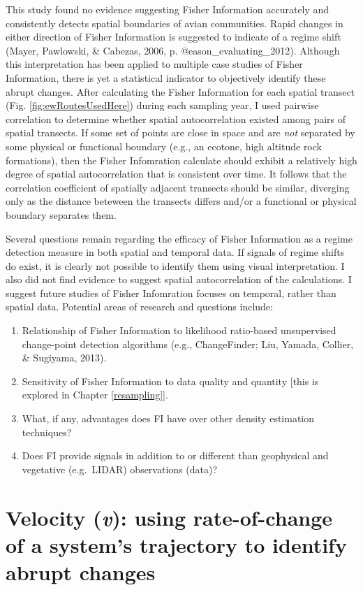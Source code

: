 \documentclass[12pt,twoside,openany]{reedthesis}
\providecommand{\tightlist}{%
  \setlength{\itemsep}{0pt}\setlength{\parskip}{0pt}}
\begin{document}
This study found no evidence suggesting Fisher Information accurately and consistently detects spatial boundaries of avian communities. Rapid changes in either direction of Fisher Information is suggested to indicate of a regime shift (Mayer, Pawlowski, \& Cabezas, 2006, p. @eason\_evaluating\_2012). Although this interpretation has been applied to multiple case studies of Fisher Information, there is yet a statistical indicator to objectively identify these abrupt changes. After calculating the Fisher Information for each spatial transect (Fig. \ref{fig:ewRoutesUsedHere}) during each sampling year, I used pairwise correlation to determine whether spatial autocorrelation existed among pairs of spatial transects. If some set of points are close in space and are \emph{not} separated by some physical or functional boundary (e.g., an ecotone, high altitude rock formations), then the Fisher Infomration calculate should exhibit a relatively high degree of spatial autocorrelation that is consistent over time. It follows that the correlation coefficient of spatially adjacent transects should be similar, diverging only as the distance beteween the transects differs and/or a functional or physical boundary separates them.

Several questions remain regarding the efficacy of Fisher Information as a regime detection measure in both spatial and temporal data. If signals of regime shifts do exist, it is clearly not possible to identify them using visual interpretation. I also did not find evidence to suggest spatial autocorrelation of the calculations. I suggest future studies of Fisher Infomration focuses on temporal, rather than spatial data. Potential areas of research and questions include:
\begin{enumerate}
\def\labelenumi{\arabic{enumi}.}
\tightlist
\item
  Relationship of Fisher Information to likelihood ratio-based unsupervised change-point detection algorithms (e.g., ChangeFinder; Liu, Yamada, Collier, \& Sugiyama, 2013).\\
\item
  Sensitivity of Fisher Information to data quality and quantity {[}this is explored in Chapter \ref{resampling}{]}.
\item
  What, if any, advantages does FI have over other density estimation techniques?
\item
  Does FI provide signals in addition to or different than geophysical and vegetative (e.g.~LIDAR) observations (data)?
\end{enumerate}
\hypertarget{velocity}{%
\chapter{\texorpdfstring{Velocity (\emph{v}): using rate-of-change of a system's trajectory to identify abrupt changes}{Velocity (v): using rate-of-change of a system's trajectory to identify abrupt changes}}\label{velocity}}
\end{document}
